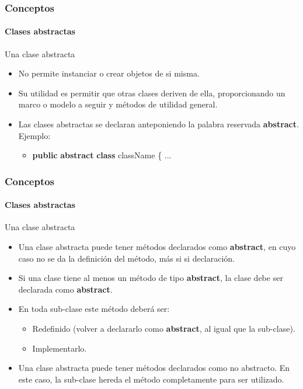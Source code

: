 \documentclass{beamer}
\begin{document}
		\begin{frame}
			\frametitle{Conceptos}
			\framesubtitle{Clases abstractas}

			\begin{block}{Una clase abstracta}
				\begin{itemize}
  					\item No permite instanciar o crear objetos de si misma.
					\item Su utilidad es permitir que otras clases deriven de ella, proporcionando un marco o modelo a seguir y m\'etodos de utilidad general.
					\item Las clases abstractas se declaran anteponiendo la palabra reservada \textbf{abstract}. Ejemplo:
					\begin{itemize}
  						\item \textbf{public} \textbf{abstract} \textbf{class} className \{ ...
					\end{itemize}
				\end{itemize}
			\end{block}
		\end{frame}
	
		\begin{frame}
			\frametitle{Conceptos}
			\framesubtitle{Clases abstractas}

			\begin{block}{Una clase abstracta}
				\begin{itemize}
  					\item Una clase abstracta puede tener m\'etodos declarados como \textbf{abstract}, en cuyo caso no se da la definici\'on del m\'etodo, m\'as si si declaraci\'on.
					\item Si una clase tiene al menos un m\'etodo de tipo \textbf{abstract}, la clase debe ser declarada como \textbf{abstract}.
					\item En toda sub-clase este m\'etodo deber\'a ser:
					\begin{itemize}
  						\item Redefinido (volver a declararlo como \textbf{abstract}, al igual que la sub-clase).
						\item Implementarlo.
					\end{itemize}
					\item Una clase abstracta puede tener m\'etodos declarados como no abstracto. En este caso, la sub-clase hereda el m\'etodo completamente para ser utilizado.
				\end{itemize}
			\end{block}
		\end{frame}
\end{document}
